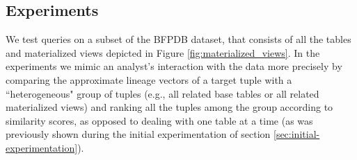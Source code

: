 
\subsection{Experiments}
\begin{runexperiment}
We test queries on a subset of the BFPDB dataset, that consists of all the tables and materialized views depicted in Figure \ref{fig:materialized_views}. In the experiments we mimic an analyst's interaction with the data more precisely by comparing the approximate lineage vectors of a target tuple with a ``heterogeneous" group of tuples (e.g., all related base tables or all related materialized views) and ranking all the tuples among the group according to similarity scores, as opposed to dealing with one table at a time (as was previously shown during the initial experimentation of section \ref{sec:initial-experimentation}).
\end{runexperiment}

